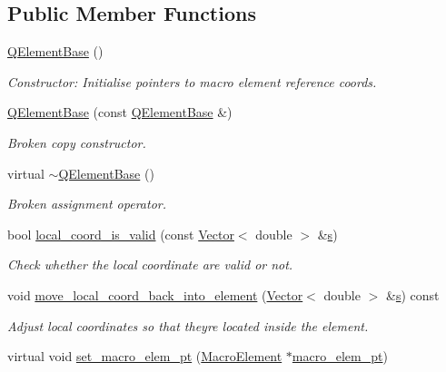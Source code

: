 \subsection*{Public Member Functions}
\begin{DoxyCompactItemize}
\item 
\hyperlink{classoomph_1_1QElementBase_a2862932b7cda1fc8a8ea445b0ae15473}{Q\+Element\+Base} ()
\begin{DoxyCompactList}\small\item\em Constructor\+: Initialise pointers to macro element reference coords. \end{DoxyCompactList}\item 
\hyperlink{classoomph_1_1QElementBase_ae2f375a4476a7f555a1ac68f0f0fe0e0}{Q\+Element\+Base} (const \hyperlink{classoomph_1_1QElementBase}{Q\+Element\+Base} \&)
\begin{DoxyCompactList}\small\item\em Broken copy constructor. \end{DoxyCompactList}\item 
virtual \hyperlink{classoomph_1_1QElementBase_af280c893096d9635027d57ff49521fb2}{$\sim$\+Q\+Element\+Base} ()
\begin{DoxyCompactList}\small\item\em Broken assignment operator. \end{DoxyCompactList}\item 
bool \hyperlink{classoomph_1_1QElementBase_a3899ee1cbbe7b89bde7232b437a0a65c}{local\+\_\+coord\+\_\+is\+\_\+valid} (const \hyperlink{classoomph_1_1Vector}{Vector}$<$ double $>$ \&\hyperlink{cfortran_8h_ab7123126e4885ef647dd9c6e3807a21c}{s})
\begin{DoxyCompactList}\small\item\em Check whether the local coordinate are valid or not. \end{DoxyCompactList}\item 
void \hyperlink{classoomph_1_1QElementBase_a9afe6bb8b04af4c016a78f98de9b22d0}{move\+\_\+local\+\_\+coord\+\_\+back\+\_\+into\+\_\+element} (\hyperlink{classoomph_1_1Vector}{Vector}$<$ double $>$ \&\hyperlink{cfortran_8h_ab7123126e4885ef647dd9c6e3807a21c}{s}) const
\begin{DoxyCompactList}\small\item\em Adjust local coordinates so that they\textquotesingle{}re located inside the element. \end{DoxyCompactList}\item 
virtual void \hyperlink{classoomph_1_1QElementBase_a072ce3dcdffdc446f439ec86ea01ae7e}{set\+\_\+macro\+\_\+elem\+\_\+pt} (\hyperlink{classoomph_1_1MacroElement}{Macro\+Element} $\ast$\hyperlink{classoomph_1_1FiniteElement_aa8bce95f69e3199a508672eea7ecc226}{macro\+\_\+elem\+\_\+pt})

\end{DoxyCompactItemize}
